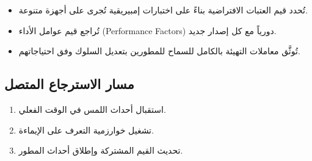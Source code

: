 \begin{Arabic}
\begin{itemize}
    \item تُحدد قيم العتبات الافتراضية بناءً على اختبارات إمبيريقية تُجرى على أجهزة متنوعة.
    \item تُراجع قيم عوامل الأداء (\textenglish{Performance Factors}) دورياً مع كل إصدار جديد.
    \item تُوثَّق معاملات التهيئة بالكامل للسماح للمطورين بتعديل السلوك وفق احتياجاتهم.
\end{itemize}

\subsection{مسار الاسترجاع المتصل}

\begin{enumerate}
    \item استقبال أحداث اللمس في الوقت الفعلي.
    \item تشغيل خوارزمية التعرف على الإيماءة.
    \item تحديث القيم المشتركة وإطلاق أحداث المطور.
\end{enumerate}

\end{Arabic}

